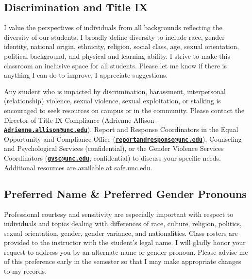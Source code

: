 \documentclass[11pt]{article}
\begin{document}
\subsection*{Discrimination and Title IX}
I value the perspectives of individuals from all backgrounds reflecting the diversity of our students. I broadly define diversity to include race, gender identity, national origin, ethnicity, religion, social class, age, sexual orientation, political background, and physical and learning ability. I strive to make this classroom an inclusive space for all students. Please let me know if there is anything I can do to improve, I appreciate suggestions.

Any student who is impacted by discrimination, harassment, interpersonal (relationship) violence, sexual violence, sexual exploitation, or stalking is encouraged to seek resources on campus or in the community. Please contact the Director of Title IX Compliance (Adrienne Allison - \href{Adrienne.allison@unc.edu}{\tt\bf Adrienne.allison@unc.edu}), Report and Response Coordinators in the Equal Opportunity and Compliance Office (\href{reportandresponse@unc.edu}{\tt\bf reportandresponse@unc.edu}), Counseling and Psychological Services (confidential), or the Gender Violence Services Coordinators (\href{gvsc@unc.edu}{\tt\bf gvsc@unc.edu}; confidential) to discuss your specific needs. Additional resources are available at safe.unc.edu.

\subsection*{Preferred Name \& Preferred Gender Pronouns}
Professional courtesy and sensitivity are especially important with respect to individuals and topics dealing with differences of race, culture, religion, politics, sexual orientation, gender, gender variance, and nationalities. Class rosters are provided to the instructor with the student's legal name. I will gladly honor your request to address you by an alternate name or gender pronoun. Please advise me of this preference early in the semester so that I may make appropriate changes to my records.


\end{document}
